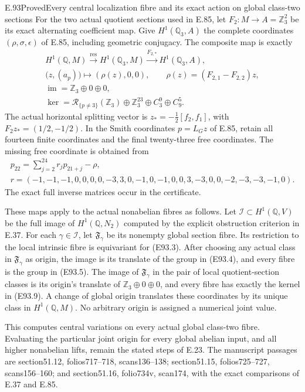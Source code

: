 \begin{statement}{E.93}{Proved}{Every central localization fibre and its exact action on global class-two sections}
For the two actual quotient sections used in E.85, let
$F_2:M\to A=\mathbb Z_3^2$ be its exact alternating
coefficient map. Give $H^1(\mathbb Q_3,A)$ the complete
coordinates $(\rho,\sigma,\epsilon)$ of E.85, including
geometric conjugacy. The composite map is exactly
\[
 \begin{gathered}
 H^1(\mathbb Q,M)\xrightarrow{\operatorname{res}}
 H^1(\mathbb Q_3,M)\xrightarrow{F_{2,*}}
 H^1(\mathbb Q_3,A),\\
 \bigl(z,(a_p)\bigr)\longmapsto(\rho(z),0,0),
 \qquad \rho(z)=(F_{2,1}-F_{2,2})z,\\
 \operatorname{im}=\mathbb Z_3\oplus0\oplus0,\\
 \ker=\mathcal R_{\{p\ne3\}}(\mathbb Z_3)
       \oplus\mathbb Z_3^{23}\oplus C_3^9\oplus C_9^5.
 \end{gathered}
 \tag{E93.9}
\]
The actual horizontal splitting vector is
$z_*=-\frac12[f_2,f_1]$, with
$F_2z_*=(1/2,-1/2)$. In the Smith coordinates
$p=L_Gz$ of E.85, retain all fourteen finite coordinates
and the final twenty-three free coordinates. The missing
free coordinate is obtained from
\[
 \begin{gathered}
 p_{22}=\sum_{j=2}^{24}r_jp_{21+j}-\rho,\\
 r=(-1,-1,-1,0,0,0,0,-3,3,0,-1,0,
       -1,0,0,3,-3,0,0,-2,-3,-3,-1,0).
 \end{gathered}
 \tag{E93.10}
\]
The exact full inverse matrices occur in the certificate.

These maps apply to the actual nonabelian fibres as follows.
Let $\mathcal I\subset H^1(\mathbb Q,V)$ be the full image
of $H^1(\mathbb Q,N_2)$ computed by the explicit obstruction
criterion in E.37. For each $\gamma\in\mathcal I$, let
$\mathfrak F_\gamma$ be its nonempty global section fibre.
Its restriction to the local intrinsic fibre is equivariant
for (E93.3). After choosing any actual class in
$\mathfrak F_\gamma$ as origin, the image is its translate
of the group in (E93.4), and every fibre is the group in
(E93.5). The image of $\mathfrak F_\gamma$ in the pair of
local quotient-section classes is its origin's translate
of $\mathbb Z_3\oplus0\oplus0$, and every fibre has exactly
the kernel in (E93.9). A change of global origin translates
these coordinates by its unique class in $H^1(\mathbb Q,M)$.
No arbitrary origin is assigned a numerical joint value.

This computes central variations on every actual global
class-two fibre. Evaluating the particular joint origin for
every global abelian input, and all higher nonabelian lifts,
remain the stated steps of E.23. The manuscript passages
are section51.12, folios717--718, scans136--138; section51.15,
folios725--727, scans156--160; and section51.16, folio734v,
scan174, with the exact comparisons of E.37 and E.85.
\end{statement}
